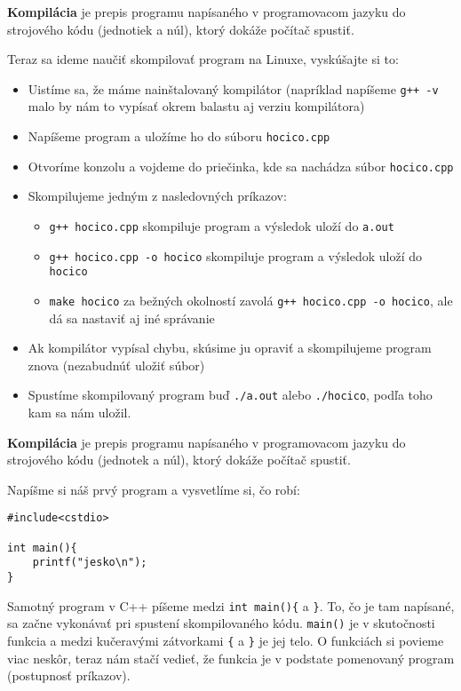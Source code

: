 
\textbf{Kompilácia} je prepis programu napísaného v programovacom jazyku do
strojového kódu (jednotiek a núl), ktorý dokáže počítač spustiť.

Teraz sa ideme naučiť skompilovať program na Linuxe, vyskúšajte si to:
\begin{itemize}
    \item Uistíme sa, že máme nainštalovaný kompilátor 
    (napríklad napíšeme \verb!g++ -v! malo by nám to 
    vypísať okrem balastu aj verziu kompilátora)
    \item Napíšeme program a uložíme ho do súboru \verb!hocico.cpp!
    \item Otvoríme konzolu a vojdeme do priečinka, 
    kde sa nachádza súbor \verb!hocico.cpp!
    \item Skompilujeme jedným z nasledovných príkazov:
    \begin{itemize}
        \item \verb!g++ hocico.cpp! skompiluje program 
        a výsledok uloží do \verb!a.out!
        \item \verb!g++ hocico.cpp -o hocico! skompiluje program 
        a výsledok uloží do \verb!hocico!
        \item \verb!make hocico! za bežných okolností zavolá 
        \verb!g++ hocico.cpp -o hocico!, ale dá sa nastaviť aj iné správanie
    \end{itemize}
    \item Ak kompilátor vypísal chybu, skúsime ju opraviť a skompilujeme
    program znova (nezabudnúť uložiť súbor) 
    \item Spustíme skompilovaný program
    buď \verb!./a.out! alebo \verb!./hocico!, podľa toho kam sa nám uložil.
    
\end{itemize}


\textbf{Kompilácia} je prepis programu napísaného v programovacom jazyku do
strojového kódu (jednotek a núl), ktorý dokáže počítač spustiť.


Napíšme si náš prvý program a vysvetlíme si, čo robí:
\begin{lstlisting}
#include<cstdio>

int main(){
    printf("jesko\n");
}
\end{lstlisting}

Samotný program v C++ píšeme medzi \verb!int main(){! a \verb!}!.  To, čo je
tam napísané, sa začne vykonávať pri spustení skompilovaného kódu.
\verb!main()! je v skutočnosti funkcia a medzi kučeravými zátvorkami \verb'{'
a \verb'}' je jej telo.  O funkciách si povieme viac neskôr, teraz nám stačí
vedieť, že funkcia je v podstate pomenovaný program (postupnosť príkazov). 

